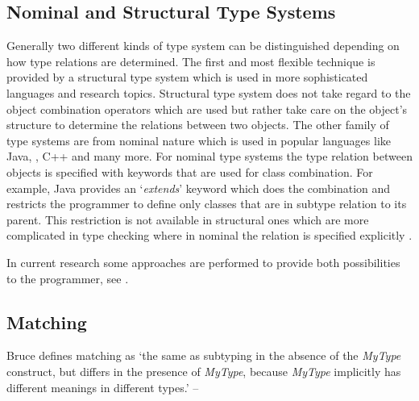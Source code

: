 \subsection{Nominal and Structural Type Systems}
Generally two different kinds of type system can be distinguished
depending on how type relations are determined. The first and most
flexible technique is provided by a structural type system which is used
in more sophisticated languages and research topics. Structural type
system does not take regard to the object combination operators which
are used but rather take care on the object's structure to determine the
relations between two objects. The other family of type systems are from
nominal nature which is used in popular languages like Java, \cs, C++
and many more. For nominal type systems the type relation between objects
is specified with keywords that are used for class combination. For
example, Java provides an `\emph{extends}' keyword which does the combination
and restricts the programmer to define only classes that are in subtype
relation to its parent. This restriction is not available in structural
ones which are more complicated in type checking where in nominal the
relation is specified explicitly \cite{malayeri_integrating_2008,pierce_types_2002}.

In current research some approaches are performed
to provide both possibilities to the programmer, see
\cite{findler_semantic_2004,gil_whiteoak:_2008,malayeri_integrating_2008}.

\subsection{Matching}
\label{subsec:matching}
\begin{prop}[Matching]
	\label{prop:matching}
	Bruce defines matching as `the same as subtyping in the absence
	of the \emph{MyType} construct, but differs in the presence of
	\emph{MyType}, because \emph{MyType} implicitly has different
	meanings in different types.' -- \cite{bruce_foundations_2002}
\end{prop}

